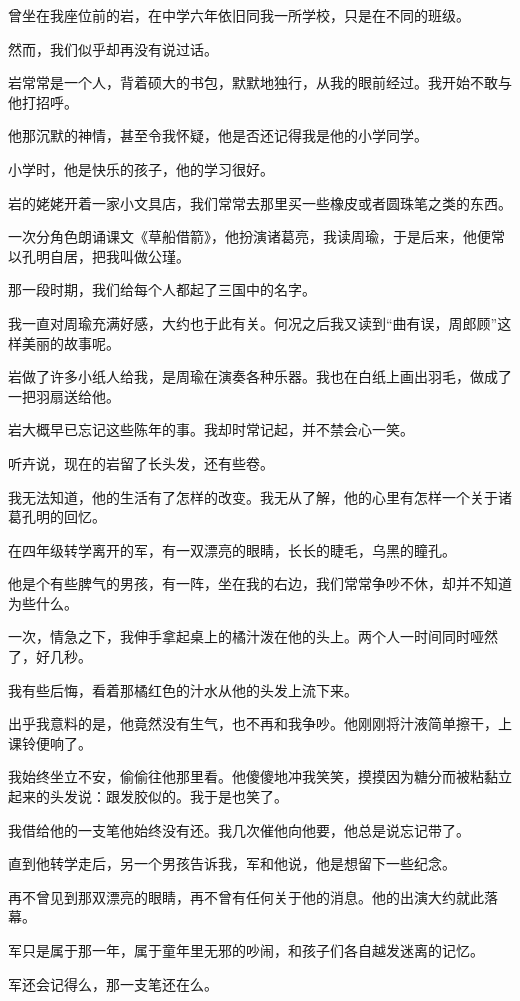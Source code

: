 		曾坐在我座位前的岩，在中学六年依旧同我一所学校，只是在不同的班级。\par
		然而，我们似乎却再没有说过话。

		岩常常是一个人，背着硕大的书包，默默地独行，从我的眼前经过。我开始不敢与他打招呼。\par
		他那沉默的神情，甚至令我怀疑，他是否还记得我是他的小学同学。

		小学时，他是快乐的孩子，他的学习很好。\par
		岩的姥姥开着一家小文具店，我们常常去那里买一些橡皮或者圆珠笔之类的东西。\par
		一次分角色朗诵课文《草船借箭》，他扮演诸葛亮，我读周瑜，于是后来，他便常以孔明自居，把我叫做公瑾。\par
		那一段时期，我们给每个人都起了三国中的名字。\par
		我一直对周瑜充满好感，大约也于此有关。何况之后我又读到“曲有误，周郎顾”这样美丽的故事呢。\par
		岩做了许多小纸人给我，是周瑜在演奏各种乐器。我也在白纸上画出羽毛，做成了一把羽扇送给他。\par
		岩大概早已忘记这些陈年的事。我却时常记起，并不禁会心一笑。

		听卉说，现在的岩留了长头发，还有些卷。\par
		我无法知道，他的生活有了怎样的改变。我无从了解，他的心里有怎样一个关于诸葛孔明的回忆。

		在四年级转学离开的军，有一双漂亮的眼睛，长长的睫毛，乌黑的瞳孔。\par
		他是个有些脾气的男孩，有一阵，坐在我的右边，我们常常争吵不休，却并不知道为些什么。\par
		一次，情急之下，我伸手拿起桌上的橘汁泼在他的头上。两个人一时间同时哑然了，好几秒。\par
		我有些后悔，看着那橘红色的汁水从他的头发上流下来。\par
		出乎我意料的是，他竟然没有生气，也不再和我争吵。他刚刚将汁液简单擦干，上课铃便响了。\par
		我始终坐立不安，偷偷往他那里看。他傻傻地冲我笑笑，摸摸因为糖分而被粘黏立起来的头发说：跟发胶似的。我于是也笑了。

		我借给他的一支笔他始终没有还。我几次催他向他要，他总是说忘记带了。\par
		直到他转学走后，另一个男孩告诉我，军和他说，他是想留下一些纪念。

		再不曾见到那双漂亮的眼睛，再不曾有任何关于他的消息。他的出演大约就此落幕。\par
		军只是属于那一年，属于童年里无邪的吵闹，和孩子们各自越发迷离的记忆。\par
		军还会记得么，那一支笔还在么。

